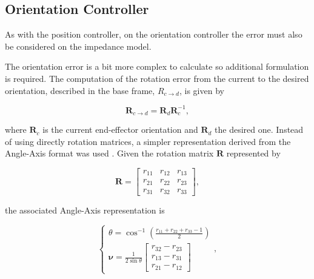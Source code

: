 
\subsection{Orientation Controller}
\label{subsec:control_architectures_cartesian_impedance_posture_optimisation_orientation_controller}

As with the position controller, on the orientation controller the error must also be considered on the impedance model.

The orientation error is a bit more complex to calculate so additional formulation is required. The computation of the rotation error from the current to the desired orientation, described in the base frame, $R_{c\to d}$, is given by \cite{Ochoa2019_control_architecture_robotic_polishing}

\begin{equation}
    \label{eq:orientation_controller_error}
    \boldsymbol{R}_{c\to d} = \boldsymbol{R}_d \boldsymbol{R}^{-1}_c,
\end{equation}

where $\boldsymbol{R}_c$ is the current end-effector orientation and $\boldsymbol{R}_d$ the desired one. Instead of using directly rotation matrices, a simpler representation derived from the Angle-Axis format was used \cite{Ochoa2019_control_architecture_robotic_polishing}. Given the rotation matrix $\boldsymbol{R}$ represented by

\begin{equation}
    \label{eq:orientation_controller_rotation_matrix}
    \boldsymbol{R} = \begin{bmatrix} 
    r_{11} & r_{12} & r_{13}\\
    r_{21} & r_{22} & r_{23}\\
    r_{31} & r_{32} & r_{33}
    \end{bmatrix},
\end{equation}

the associated Angle-Axis representation is

\begin{equation}
    \label{eq:orientation_controller_angle_axis}
    \begin{cases}
        \theta = \cos^{-1}\left({\frac{r_{11}+r_{22}+r_{33}-1}{2}} \right)\\
        \boldsymbol{\nu} = \frac{1}{2\sin{\theta}} \begin{bmatrix}
        r_{32} - r_{23}\\
        r_{13} - r_{31}\\
        r_{21} - r_{12}
        \end{bmatrix}
    \end{cases},
\end{equation}

